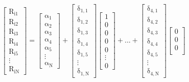 \documentclass[11pt, english]{article}
\begin{document}
		$$\mathrm{
		\begin{bmatrix}
			R_{i1}\\
			R_{i2}\\
			R_{i3}\\
			R_{i4}\\
			R_{i5}\\
			\vdots\\
			R_{iN}
		\end{bmatrix}=
		\begin{bmatrix}
			\alpha_1\\
			\alpha_2\\
			\alpha_3\\
			\alpha_4\\
			\alpha_5\\
			\vdots\\
			\alpha_N
		\end{bmatrix}+
		\begin{bmatrix}
			\delta_{1,1}\\
			\delta_{1,2}\\
			\delta_{1,3}\\
			\delta_{1,4}\\
			\delta_{1,5}\\
			\vdots\\
			\delta_{1,N}
		\end{bmatrix}
		\begin{bmatrix}
			1\\
			0\\
			0\\
			0\\
			0\\
			\vdots\\
			0
                \end{bmatrix}+...+
		\begin{bmatrix}
			\delta_{4,1}\\
                        \delta_{4,2}\\
                        \delta_{4,3}\\
                        \delta_{4,4}\\
                        \delta_{4,5}\\
                        \vdots\\
                        \delta_{4,N}
                \end{bmatrix}
		\begin{bmatrix}
			0\\
                        0\\
                        0\\

\end{bmatrix}}$$
\end{document}
